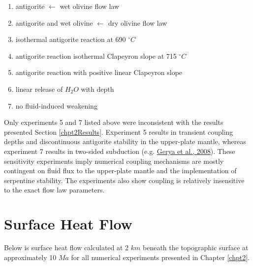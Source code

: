 \begin{enumerate}
\def\labelenumi{\arabic{enumi}.}
\tightlist
\item
  antigorite \(\leftarrow\) wet olivine flow law
\item
  antigorite and wet olivine \(\leftarrow\) dry olivine flow law
\item
  isothermal antigorite reaction at 690 \(^{\circ}C\)
\item
  antigorite reaction isothermal Clapeyron slope at 715 \(^{\circ}C\)
\item
  antigorite reaction with positive linear Clapeyron slope
\item
  linear release of \(H_{2}O\) with depth
\item
  no fluid-induced weakening
\end{enumerate}

Only experiments 5 and 7 listed above were inconsistent with the results presented Section \ref{chpt2Results}. Experiment 5 results in transient coupling depths and discontinuous antigorite stability in the upper-plate mantle, whereas experiment 7 results in two-sided subduction (e.g. \protect\hyperlink{ref-gerya2008}{Gerya et al., 2008}). These sensitivity experiments imply numerical coupling mechanisms are mostly contingent on fluid flux to the upper-plate mantle and the implementation of serpentine stability. The experiments also show coupling is relatively insensitive to the exact flow law parameters.

\hypertarget{surface-heat-flow-1}{%
\section{Surface Heat Flow}\label{surface-heat-flow-1}}

Below is surface heat flow calculated at 2 \(km\) beneath the topographic surface at approximately 10 \(Ma\) for all numerical experiments presented in Chapter \ref{chpt2}.

